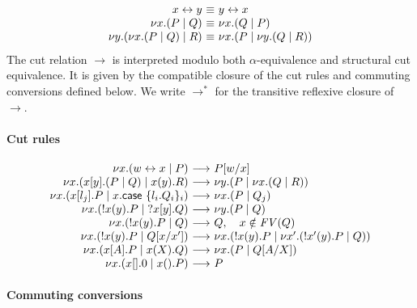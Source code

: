 \documentclass{easychair}
\makeatletter
\newcommand{\ba}{\begin{array}}
\newcommand{\ea}{\end{array}}
\newenvironment{equations}{\[\ba{@{}r@{~}c@{~}l@{}}}{\ea\]}
\newcommand{\key}{\mathsf}
\newcommand{\set}[1]{\{ #1 \}}
\newcommand{\row}[2]{\set{#1}_{#2}}
\newcommand{\la}{l}
\newcommand{\cpLink}[2]{{#1} \leftrightarrow {#2}}
\newcommand{\cpCut}[3]{\nu {#1}.({#2} \mid {#3})}
\newcommand{\cpOutput}[4]{{#1}[{#2}].({#3} \mid {#4})}
\newcommand{\cpInput}[3]{{#1}({#2}).{#3}}
\newcommand{\cpInject}[3]{{#1}[{#2}].{#3}}
\newcommand{\cpCase}[2]{{#1}.\key{case}~{#2}}
\newcommand{\cpServe}[3]{!{#1}({#2}).{#3}}
\newcommand{\cpRequest}[3]{?{#1}[{#2}].{#3}}
\newcommand{\cpEmptyOut}[1]{{#1}[].0}
\newcommand{\cpEmptyIn}[2]{{#1}().{#2}}
\newcommand{\cpSendType}[3]{{#1}[{#2}].{#3}}
\newcommand{\cpReceiveType}[3]{{#1}({#2}).{#3}}
\newcommand{\FV}[1]{\mathit{FV}(#1)}
\newcommand{\subst}[3]{{#1}[{#2}/{#3}]}
\newcommand{\redto}{\longrightarrow}
\newcommand{\eqto}{\equiv}
\makeatother
\begin{document}
\begin{equations}
\cpLink{x}{y} &\eqto& \cpLink{y}{x} \\
\cpCut{x}{P}{Q} &\eqto& \cpCut{x}{Q}{P} \\
\cpCut{y}{\cpCut{x}{P}{Q}}{R} &\eqto& \cpCut{x}{P}{\cpCut{y}{Q}{R}} \\
\end{equations}%
%
The cut relation $\redto$ is interpreted modulo both $\alpha$-equivalence and structural cut
equivalence. It is given by the compatible closure of the cut rules and commuting conversions
defined below. We write $\redto^*$ for the transitive reflexive closure of $\redto$.

\paragraph{Cut rules}

\begin{equations}
\cpCut{x}{\cpLink{w}{x}}{P}
  &\redto& \subst{P}{w}{x} \\
\cpCut{x}{\cpOutput{x}{y}{P}{Q}}{\cpInput{x}{y}{R}}
  &\redto& \cpCut{y}{P}{\cpCut{x}{Q}{R}} \\
\cpCut{x}{\cpInject{x}{\la_j}{P}}{\cpCase{x}{\row{\la_i.Q_i}{i}}}
  &\redto& \cpCut{x}{P}{Q_j} \\
\cpCut{x}{\cpServe{x}{y}{P}}{\cpRequest{x}{y}{Q}}
  &\redto& \cpCut{y}{P}{Q} \\
\cpCut{x}{\cpServe{x}{y}{P}}{Q}
  &\redto& Q, \quad x \notin \FV{Q} \\
\cpCut{x}{\cpServe{x}{y}{P}}{\subst{Q}{x}{x'}}
  &\redto& \cpCut{x}{\cpServe{x}{y}{P}}{\cpCut{x'}{\cpServe{x'}{y}{P}}{Q}} \\
\cpCut{x}{\cpSendType{x}{A}{P}}{\cpReceiveType{x}{X}{Q}}
  &\redto& \cpCut{x}{P}{\subst{Q}{A}{X}} \\
\cpCut{x}{\cpEmptyOut{x}}{\cpEmptyIn{x}{P}}
  &\redto& P \\
\end{equations}%

\paragraph{Commuting conversions}
\end{document}
